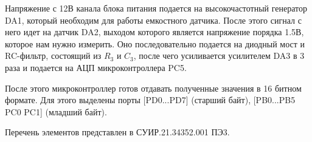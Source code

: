 Напряжение с 12В канала блока питания подается на высокочастотный генератор DA1, который необходим для работы емкостного датчика. После этого сигнал с него идет на датчик DA2, выходом которого является напряжение порядка 1.5В, которое нам нужно измерить. Оно последовательно подается на диодный мост и RC-фильтр, состоящий из \(R_3\) и \(C_3\), после чего усиливается усилителем DA3 в 3 раза и подается на АЦП микроконтроллера PC5.

После этого микроконтроллер готов отдавать полученные значения в 16 битном формате. Для этого выделены порты [PD0...PD7] (старший байт), [PB0...PB5 PC0 PC1] (младший байт).

Перечень элементов представлен в СУИР.21.34352.001 ПЭ3.
\endinput